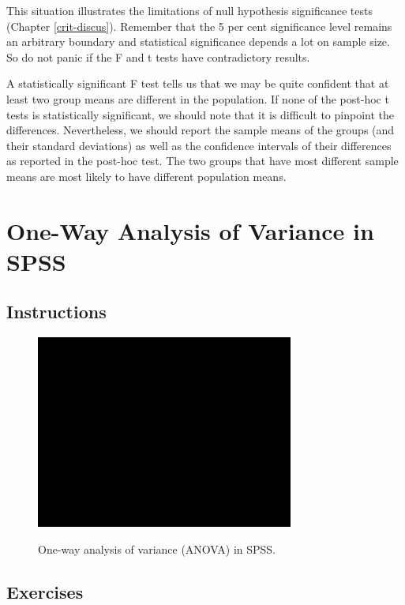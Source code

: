 \documentclass[a4paper]{book}
\theoremstyle{definition}
\theoremstyle{definition}
\theoremstyle{definition}
\theoremstyle{remark}
\begin{document}
This situation illustrates the limitations of null hypothesis
significance tests (Chapter \ref{crit-discus}). Remember that the 5 per
cent significance level remains an arbitrary boundary and statistical
significance depends a lot on sample size. So do not panic if the F and
t tests have contradictory results.

A statistically significant F test tells us that we may be quite
confident that at least two group means are different in the population.
If none of the post-hoc t tests is statistically significant, we should
note that it is difficult to pinpoint the differences. Nevertheless, we
should report the sample means of the groups (and their standard
deviations) as well as the confidence intervals of their differences as
reported in the post-hoc test. The two groups that have most different
sample means are most likely to have different population means.

\section{One-Way Analysis of Variance in SPSS}\label{onewaySPSS}

\subsection{Instructions}\label{instructions-4}

\begin{figure}[H]
\href{https://www.youtube.com/embed/1-kh9_pGI9k}{\includegraphics[width=320px]{GentleIntro_files/figure-latex/SPSS1way-1} }\caption{One-way analysis of variance (ANOVA) in SPSS.}\label{fig:SPSS1way}
\end{figure}

\subsection{Exercises}\label{exercises-5}
\end{document}
